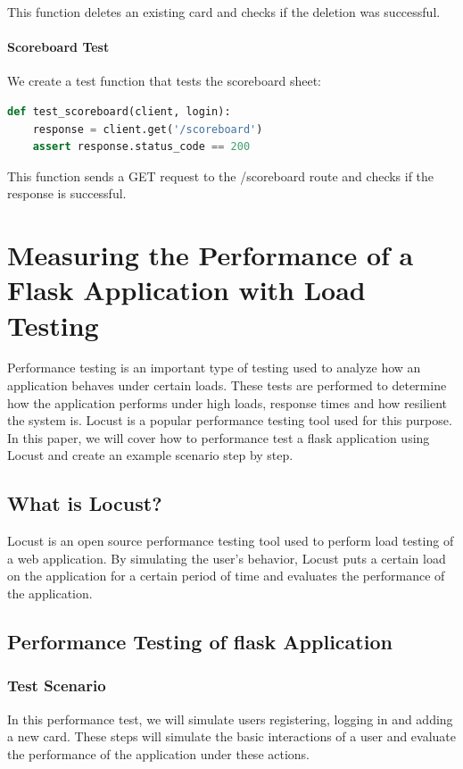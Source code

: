 This function deletes an existing card and checks if the deletion was successful.\newpage

\paragraph{Scoreboard Test}
We create a test function that tests the scoreboard sheet:

\begin{lstlisting}[language=Python]
def test_scoreboard(client, login):
    response = client.get('/scoreboard')
    assert response.status_code == 200

\end{lstlisting}

This function sends a GET request to the /scoreboard route and checks if the response is successful.

\section{Measuring the Performance of a Flask Application with Load Testing}

Performance testing is an important type of testing used to analyze how an application behaves under certain loads. These tests are performed to determine how the application performs under high loads, response times and how resilient the system is. Locust is a popular performance testing tool used for this purpose. In this paper, we will cover how to performance test a flask application using Locust and create an example scenario step by step.

\subsection{What is Locust?}
Locust is an open source performance testing tool used to perform load testing of a web application. By simulating the user's behavior, Locust puts a certain load on the application for a certain period of time and evaluates the performance of the application.

\subsection{Performance Testing of flask Application}

\subsubsection{Test Scenario}
In this performance test, we will simulate users registering, logging in and adding a new card. These steps will simulate the basic interactions of a user and evaluate the performance of the application under these actions.
